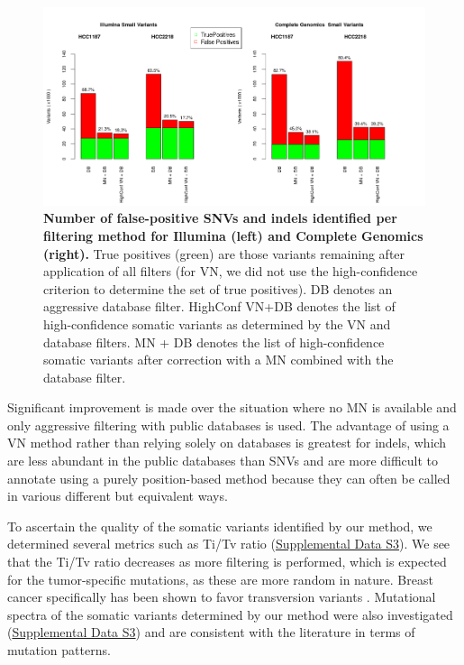 \begin{figure}[t!]
\centering
\includegraphics[width=\textwidth]{chapters/images/virtualnormal/Hiltemann_Figure2.png}
\caption{\textbf{Number of false-positive SNVs and indels identified per filtering method for Illumina (left) and Complete Genomics (right).} True positives (green) are those variants remaining after application of all filters (for VN, we did not use the high-confidence criterion to determine the set of true positives). DB denotes an aggressive database filter. HighConf VN+DB denotes the list of high-confidence somatic variants as determined by the VN and database filters. MN + DB denotes the list of high-confidence somatic variants after correction with a MN combined with the database filter. }
\label{fig:snvcomparison}
\end{figure}

Significant improvement is made over the situation where no MN is available and only aggressive filtering with public databases is used. The advantage of using a VN method rather than relying solely on databases is greatest for indels, which are less abundant in the public databases than SNVs and are more difficult to annotate using a purely position-based method because they can often be called in various different but equivalent ways.

To ascertain the quality of the somatic variants identified by our method, we determined several metrics such as Ti/Tv ratio (\href{https://genome.cshlp.org/content/25/9/1382/suppl/DC1}{Supplemental Data S3}). We see that the Ti/Tv ratio decreases as more filtering is performed, which is expected for the tumor-specific mutations, as these are more random in nature. Breast cancer specifically has been shown to favor transversion variants \cite{liu2002genetic}. Mutational spectra of the somatic variants determined by our method were also investigated (\href{https://genome.cshlp.org/content/25/9/1382/suppl/DC1}{Supplemental Data S3}) and are consistent with the literature \cite{rubin2009mutation} in terms of mutation patterns.

